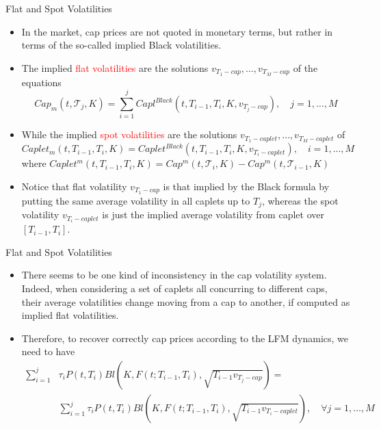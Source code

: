 \documentclass{beamer}
\begin{document}
\begin{frame}{Flat and Spot Volatilities}
	\begin{itemize}
		\item In the market, cap prices are not quoted in monetary terms, but rather in terms of the so-called implied Black volatilities. 
		\item The implied \textcolor{red}{flat volatilities} are the solutions $v_{T_1-cap},\ldots, v_{T_M-cap}$ of the equations
		\begin{equation*}
		Cap_m(t, \mathcal{T}_j, K) = \sum_{i=1}^j Capl^{Black}(t, T_{i-1}, T_i,K,v_{T_j-cap}),\quad j=1, \ldots,M
		\end{equation*}
		\item While the implied \textcolor{red}{spot volatilities} are the solutions $v_{T_1-caplet},\ldots, v_{T_M-caplet}$ of
		\begin{equation*}
		Caplet_m(t, T_{i-1},T_i,K) = Caplet^{Black}(t, T_{i-1}, T_i,K,v_{T_i-caplet}),\quad i=1, \ldots,M
		\end{equation*} 
		where $Caplet^m(t, T_{i-1}, T_i, K) = Cap^m(t, \mathcal{T}_i,K)-Cap^m(t, \mathcal{T}_{i-1},K)$
		\item Notice that flat volatility $v_{T_1-cap}$ is that implied by the Black formula by putting the same average volatility in all caplets up to $T_j$, whereas the spot volatility $v_{T_i-caplet}$ is just the implied average volatility from caplet over $[T_{i-1}, T_i]$.
	\end{itemize}
\end{frame}

\begin{frame}{Flat and Spot Volatilities}
	\begin{itemize}
		\item There seems to be one kind of inconsistency in the cap volatility system. Indeed, when considering a set of caplets all concurring to different caps, their average volatilities change moving from a cap to another, if computed as implied flat volatilities.
		\item Therefore, to recover correctly cap prices according to the LFM dynamics, we need to have
		\begin{equation*}
			\begin{aligned}
		\sum_{i=1}^j&\tau_iP(t,T_i)Bl(K,F(t;T_{i-1},T_i),\sqrt{T_{i-1}v_{T_j-cap}}) = \\ &\sum_{i=1}^j\tau_iP(t,T_i)Bl(K,F(t;T_{i-1},T_i),\sqrt{T_{i-1}v_{T_i-caplet}}),\quad \forall j = 1,\dots, M
		\end{aligned}
		\end{equation*}
	\end{itemize}
\end{frame}	
\end{document}
